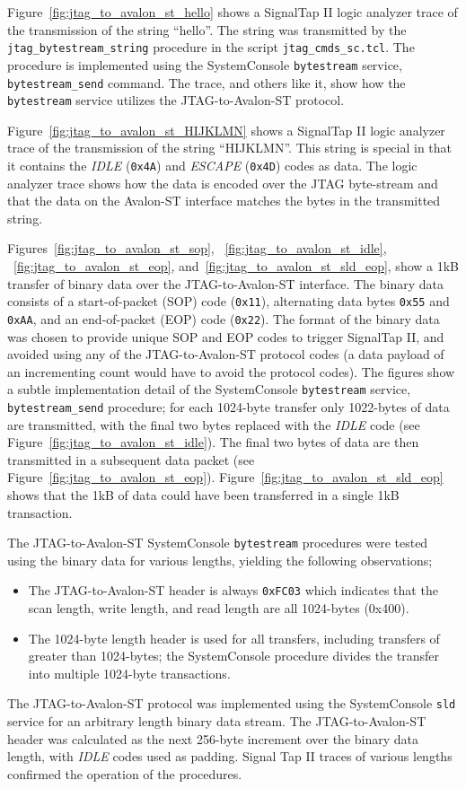\documentclass[10pt,twoside]{article}
\begin{document}
Figure~\ref{fig:jtag_to_avalon_st_hello} shows a SignalTap II logic
analyzer trace of the transmission of the string ``hello''. The
string was transmitted by the \verb+jtag_bytestream_string+
procedure in the script \verb+jtag_cmds_sc.tcl+. The
procedure is implemented using the SystemConsole \verb+bytestream+
service, \verb+bytestream_send+ command. The trace, and
others like it, show how the \verb+bytestream+ service utilizes
the JTAG-to-Avalon-ST protocol.


Figure~\ref{fig:jtag_to_avalon_st_HIJKLMN} shows a SignalTap II logic
analyzer trace of the transmission of the string ``HIJKLMN''.
This string is special in that it contains the {\em IDLE}
(\verb+0x4A+) and {\em ESCAPE} (\verb+0x4D+) codes
as data. The logic analyzer trace shows how the data is encoded
over the JTAG byte-stream and that the data on the Avalon-ST
interface matches the bytes in the transmitted string.

Figures~\ref{fig:jtag_to_avalon_st_sop},
~\ref{fig:jtag_to_avalon_st_idle}, ~\ref{fig:jtag_to_avalon_st_eop}, 
and~\ref{fig:jtag_to_avalon_st_sld_eop}, show a 1kB transfer of
binary data over the JTAG-to-Avalon-ST interface.
The binary data consists of a start-of-packet (SOP) code ({\tt 0x11}),
alternating data bytes {\tt 0x55} and {\tt 0xAA}, and an
end-of-packet (EOP) code ({\tt 0x22}). The format of the binary data
was chosen to provide unique SOP and EOP codes to trigger 
SignalTap II, and avoided using any of the JTAG-to-Avalon-ST 
protocol codes (a data payload of an incrementing count
would have to avoid the protocol codes).
The figures show a subtle implementation detail of the
SystemConsole \verb+bytestream+ service, \verb+bytestream_send+
procedure; for each 1024-byte transfer only 1022-bytes of data
are transmitted, with the final two bytes replaced with the
{\em IDLE} code (see Figure~\ref{fig:jtag_to_avalon_st_idle}).
The final two bytes of data are then transmitted
in a subsequent data packet (see Figure~\ref{fig:jtag_to_avalon_st_eop}).
Figure~\ref{fig:jtag_to_avalon_st_sld_eop} shows that the 1kB of
data could have been transferred in a single 1kB transaction.

The JTAG-to-Avalon-ST SystemConsole \verb+bytestream+ procedures
were tested using the binary data for various lengths,
yielding the following observations;
%
\begin{itemize}
\item The JTAG-to-Avalon-ST header is always \verb+0xFC03+ which
indicates that the scan length, write length, and read length
are all 1024-bytes (0x400).
%
\item The 1024-byte length header is used for all transfers,
including transfers of greater than 1024-bytes; the SystemConsole
procedure divides the transfer into multiple 1024-byte transactions.
%
\end{itemize}
%
The JTAG-to-Avalon-ST protocol was implemented using the 
SystemConsole \verb+sld+ service for an arbitrary length
binary data stream. The JTAG-to-Avalon-ST header was calculated
as the next 256-byte increment over the binary data length,
with {\em IDLE} codes used as padding. Signal Tap II traces
of various lengths confirmed the operation of the procedures.
\end{document}
